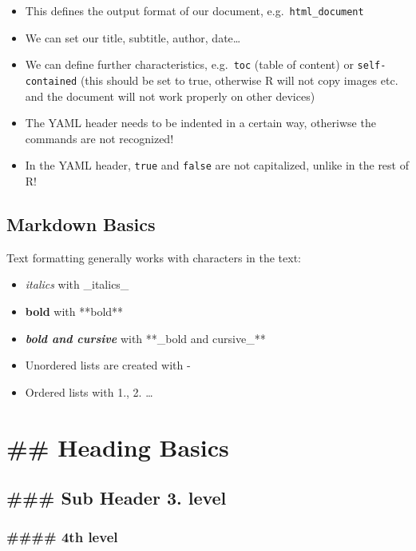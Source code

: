 \documentclass[
]{book}
\providecommand{\tightlist}{%
  \setlength{\itemsep}{0pt}\setlength{\parskip}{0pt}}
\begin{document}
\begin{itemize}
\item
  This defines the output format of our document, e.g.~\texttt{html\_document}
\item
  We can set our title, subtitle, author, date\ldots{}
\item
  We can define further characteristics, e.g.~\texttt{toc} (table of content) or \texttt{self-contained} (this should be set to true, otherwise R will not copy images etc. and the document will not work properly on other devices)
\item
  The YAML header needs to be indented in a certain way, otheriwse the commands are not recognized!
\item
  In the YAML header, \texttt{true} and \texttt{false} are not capitalized, unlike in the rest of R!
\end{itemize}

\subsection{Markdown Basics}\label{markdown-basics}

Text formatting generally works with characters in the text:

\begin{itemize}
\tightlist
\item
  \emph{italics} with \_italics\_
\item
  \textbf{bold} with **bold**
\item
  \textbf{\emph{bold and cursive}} with **\_bold and cursive\_**
\item
  Unordered lists are created with -
\item
  Ordered lists with 1., 2. \ldots{}
\end{itemize}

\section{\#\# Heading Basics}\label{heading-basics}

\subsection{\#\#\# Sub Header 3. level}\label{sub-header-3.-level}

\subsubsection{\#\#\#\# 4th level}\label{th-level}
\end{document}
